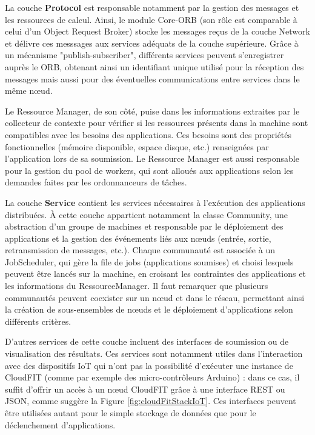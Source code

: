 La couche \textbf{Protocol} est responsable notamment par la gestion des messages et les ressources de calcul. Ainsi, le module Core-ORB (son rôle est comparable à celui d'un Object Request Broker) stocke les messages reçus de la couche Network et délivre ces messsages aux services adéquats de la couche supérieure. Grâce à un mécanisme "publish-subscriber", différents services peuvent s'enregistrer auprès le ORB, obtenant ainsi un identifiant unique utilisé pour la réception des messages mais aussi pour des éventuelles communications entre services dans le même n{\oe}ud. 

Le Ressource Manager, de son côté, puise dans les informations extraites par le collecteur de contexte pour vérifier si les ressources présents dans la machine sont compatibles avec les besoins des applications. Ces besoins sont des propriétés fonctionnelles (mémoire disponible, espace disque, etc.) renseignées par l'application lors de sa soumission. Le Ressource Manager est aussi responsable pour la gestion du pool de workers, qui sont alloués aux applications selon les demandes faites par les ordonnanceurs de tâches. 

La couche \textbf{Service}  contient les services nécessaires à l'exécution des applications distribuées. À cette couche appartient notamment la classe Community, une abstraction d'un groupe de machines et responsable par le déploiement des applications et la gestion des événements liés aux n{\oe}uds (entrée, sortie, retransmission de messages, etc.). Chaque communauté est associée à un JobScheduler, qui gère la file de jobs (applications soumises) et choisi lesquels peuvent être lancés sur la machine, en croisant les contraintes des applications et les informations du RessourceManager.  Il faut remarquer que plusieurs communautés peuvent coexister sur un n{\oe}ud et dans le réseau, permettant ainsi la création de sous-ensembles de n{\oe}uds et le déploiement d'applications selon différents critères.

 D'autres services de cette couche incluent des interfaces de soumission ou de visualisation des résultats. Ces services sont notamment utiles dans l'interaction avec des dispositifs IoT qui n'ont pas la possibilité d'exécuter une instance de CloudFIT (comme par exemple des micro-contrôleurs Arduino) : dans ce cas, il suffit d'offrir un accès à un n{\oe}ud CloudFIT grâce à une interface REST ou JSON, comme suggère la Figure \ref{fig:cloudFitStackIoT}. Ces interfaces peuvent être utilisées autant pour le simple stockage de données que pour le déclenchement d'applications.

